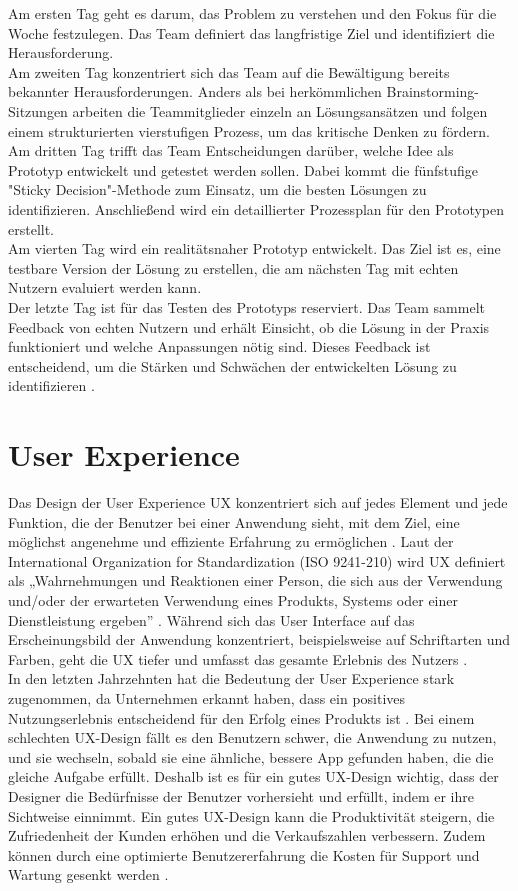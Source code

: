 Am ersten Tag geht es darum, das Problem zu verstehen und den Fokus für die Woche festzulegen. Das Team definiert das langfristige Ziel und identifiziert die Herausforderung. \\
Am zweiten Tag konzentriert sich das Team auf die Bewältigung bereits bekannter Herausforderungen. Anders als bei herkömmlichen Brainstorming-Sitzungen arbeiten die Teammitglieder einzeln an Lösungsansätzen und folgen einem strukturierten vierstufigen Prozess, um das kritische Denken zu fördern. \\
Am dritten Tag trifft das Team Entscheidungen darüber, welche Idee als Prototyp entwickelt und getestet werden sollen. Dabei kommt die fünfstufige "Sticky Decision"-Methode zum Einsatz, um die besten Lösungen zu identifizieren. Anschließend wird ein detaillierter Prozessplan für den Prototypen erstellt. \\
Am vierten Tag wird ein realitätsnaher Prototyp entwickelt. Das Ziel ist es, eine testbare Version der Lösung zu erstellen, die am nächsten Tag mit echten Nutzern evaluiert werden kann. \\
Der letzte Tag ist für das Testen des Prototyps reserviert. Das Team sammelt Feedback von echten Nutzern und erhält Einsicht, ob die Lösung in der Praxis funktioniert und welche Anpassungen nötig sind. Dieses Feedback ist entscheidend, um die Stärken und Schwächen der entwickelten Lösung zu identifizieren \cite[S.22 ff.]{Design_Sprint}.

\section{User Experience}
Das Design der User Experience \ac{UX} konzentriert sich auf jedes Element und jede Funktion, die der Benutzer bei einer Anwendung sieht, mit dem Ziel, eine möglichst angenehme und effiziente Erfahrung zu ermöglichen \cite[S.12]{Bordegoni}. 
Laut der International Organization for Standardization (ISO 9241-210) wird UX definiert als „Wahrnehmungen und Reaktionen einer Person, die sich aus der Verwendung und/oder der erwarteten Verwendung eines Produkts, Systems oder einer Dienstleistung ergeben” \cite{iso}. 
Während sich das User Interface auf das Erscheinungsbild der Anwendung konzentriert, beispielsweise auf Schriftarten und Farben, geht die UX tiefer und umfasst das gesamte Erlebnis des Nutzers \cite[S.8]{Canziba}.\\
In den letzten Jahrzehnten hat die Bedeutung der User Experience stark zugenommen, da Unternehmen erkannt haben, dass ein positives Nutzungserlebnis entscheidend für den Erfolg eines Produkts ist \cite{ux_article}. 
Bei einem schlechten UX-Design fällt es den Benutzern schwer, die Anwendung zu nutzen, und sie wechseln, sobald sie eine ähnliche, bessere App gefunden haben, die die gleiche Aufgabe erfüllt. 
Deshalb ist es für ein gutes UX-Design wichtig, dass der Designer die Bedürfnisse der Benutzer vorhersieht und erfüllt, indem er ihre Sichtweise einnimmt. Ein gutes UX-Design kann die Produktivität steigern, die Zufriedenheit der Kunden erhöhen und die Verkaufszahlen verbessern. 
Zudem können durch eine optimierte Benutzererfahrung die Kosten für Support und Wartung gesenkt werden \cite[S.8 ff.]{Canziba}.\\


